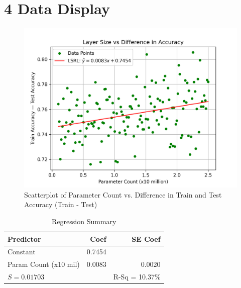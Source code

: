 \documentclass[12pt]{article}
\begin{document}
    \section*{4 Data Display}
    \begin{figure}[H]
        \centering
        \includegraphics[width=1\textwidth]{Images/Scatter}
        \caption{Scatterplot of Parameter Count vs. Difference in Train and Test Accuracy (Train - Test)}
        \label{fig:scatterplot}
    \end{figure}

    \begin{table}[ht]
        \centering
        \begin{tabular}{|l|r|r|}
            \hline
            Predictor & Coef & SE Coef \\
            \hline
            Constant & 0.7454 &  \\
            Param Count (x10 mil)   & 0.0083 & 0.0020 \\
            \hline
            \multicolumn{2}{|l|}{$S = 0.01703$} & R-Sq = 10.37\% \\
            \hline
        \end{tabular}
        \caption{Regression Summary}
        \label{tab:minitab}
    \end{table}
\end{document}
